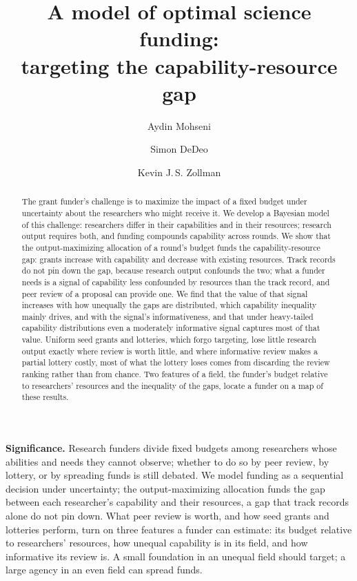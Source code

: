 \documentclass[article, 11pt, reqno]{amsart}
\title[A model of optimal science funding]{A model of optimal science funding:\\ targeting the capability-resource gap}
\author{Aydin Mohseni}
\author{Simon DeDeo}
\author{Kevin J.\,S. Zollman}
\theoremstyle{named}
\begin{document}
\begin{abstract}
The grant funder's challenge is to maximize the impact of a fixed budget under uncertainty about the researchers who might receive it. We develop a Bayesian model of this challenge: researchers differ in their capabilities and in their resources; research output requires both, and funding compounds capability across rounds. We show that the output-maximizing allocation of a round's budget funds the capability-resource gap: grants increase with capability and decrease with existing resources. Track records do not pin down the gap, because research output confounds the two; what a funder needs is a signal of capability less confounded by resources than the track record, and peer review of a proposal can provide one. We find that the value of that signal increases with how unequally the gaps are distributed, which capability inequality mainly drives, and with the signal's informativeness, and that under heavy-tailed capability distributions even a moderately informative signal captures most of that value. Uniform seed grants and lotteries, which forgo targeting, lose little research output exactly where review is worth little, and where informative review makes a partial lottery costly, most of what the lottery loses comes from discarding the review ranking rather than from chance. Two features of a field, the funder's budget relative to researchers' resources and the inequality of the gaps, locate a funder on a map of these results.
\end{abstract}

\maketitle

\noindent\textbf{Significance.} Research funders divide fixed budgets among researchers whose abilities and needs they cannot observe; whether to do so by peer review, by lottery, or by spreading funds is still debated. We model funding as a sequential decision under uncertainty; the output-maximizing allocation funds the gap between each researcher's capability and their resources, a gap that track records alone do not pin down. What peer review is worth, and how seed grants and lotteries perform, turn on three features a funder can estimate: its budget relative to researchers' resources, how unequal capability is in its field, and how informative its review is. A small foundation in an unequal field should target; a large agency in an even field can spread funds.
\end{document}
